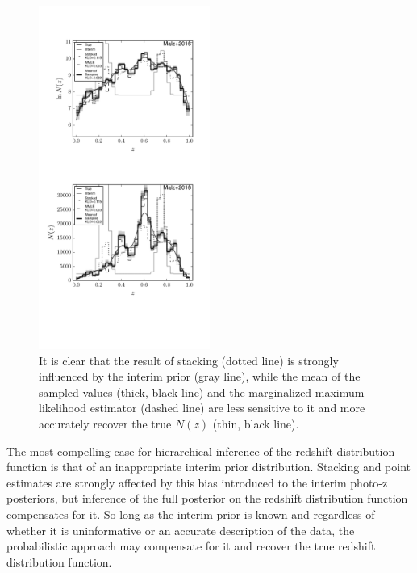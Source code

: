 \documentclass[preprint]{aastex}
\begin{document}
\begin{figure}
\includegraphics[width=0.5\textwidth]{figs/bint/comps.pdf}
\caption{It is clear that the result of stacking (dotted line) is strongly 
influenced by the interim prior (gray line), while the mean of the sampled 
values (thick, black line) and the marginalized maximum likelihood estimator 
(dashed line) are less sensitive to it and more accurately recover the true 
$N(z)$ (thin, black line).}
\label{fig:intb-comp}
\end{figure}

The most compelling case for hierarchical inference of the redshift 
distribution function is that of an inappropriate interim prior distribution.  
Stacking and point estimates are strongly affected by this bias introduced to 
the interim photo-z posteriors, but inference of the full posterior on the 
redshift distribution function compensates for it.  So long as the interim 
prior is known and regardless of whether it is uninformative or an accurate 
description of the data, the probabilistic approach may compensate for it and 
recover the true redshift distribution function.
\end{document}
